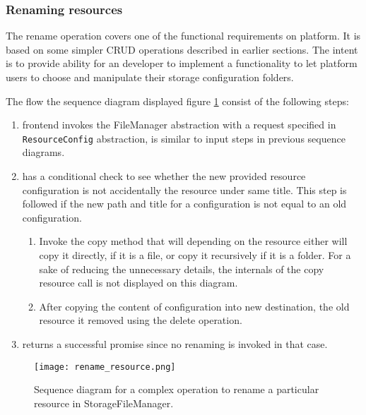 \subsubsection{Renaming resources}

The rename operation covers one of the functional requirements on \lpa{} platform. It is based on some  simpler CRUD operations described in earlier sections. The intent  is to provide  ability for an \lpa{} developer to implement a functionality to let \lpa{} platform users to choose and manipulate their storage configuration folders. 

The flow  the sequence diagram displayed  figure \ref{fig:lps_rename_resource} consist of the following steps:

\begin{enumerate}
    \item \lpa{} frontend invokes the FileManager abstraction with a request specified in  \texttt{ResourceConfig} abstraction,  is similar to  input steps in  previous sequence diagrams. 
    \item \lpas{} has a conditional check to see whether the new provided resource configuration is not accidentally the resource under same title. This step is followed if the new path and title for a configuration is not equal to an old configuration.
    	\begin{enumerate}
    	\item Invoke the copy method that will depending on the resource either will copy it directly, if it is a file, or copy it recursively if it is a folder. For a sake of reducing the unnecessary details, the internals of the copy resource call is not displayed on this diagram.
    	\item After copying the content of configuration into new destination, the old resource it removed using the delete operation.
    	\end{enumerate}
    \item \lpas{} returns a successful promise since no renaming is invoked in that case. 
\end{enumerate}

\begin{figure}[h]
\centering
\texttt{[image: rename\_resource.png]}
\caption{Sequence diagram for a complex operation to rename a particular resource in StorageFileManager.}
\label{fig:lps_rename_resource}
\end{figure}

